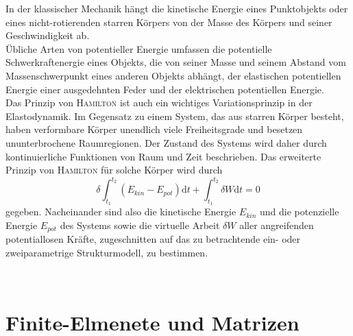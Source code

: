 \documentclass[a4paper,10pt,twoside]{article}
\numberwithin{equation}{section} %
\numberwithin{figure}{section}   %
\numberwithin{table}{section}    %
\begin{document}
	In der klassischer Mechanik hängt die kinetische Energie eines Punktobjekts oder eines nicht-rotierenden starren Körpers von der Masse des Körpers und seiner Geschwindigkeit ab. \\

	Übliche Arten von potentieller Energie umfassen die potentielle Schwerkraftenergie eines Objekts, die von seiner Masse und seinem Abstand vom Massenschwerpunkt eines anderen Objekts abhängt, der elastischen potentiellen Energie einer ausgedehnten Feder und der elektrischen potentiellen Energie.\\	
	
	Das Prinzip von \textsc{Hamilton} ist auch ein wichtiges Variationsprinzip in der Elastodynamik. Im Gegensatz zu einem System, das aus starren Körper besteht, haben verformbare Körper unendlich viele Freiheitsgrade und besetzen ununterbrochene Raumregionen. Der Zustand des Systems wird daher durch kontinuierliche Funktionen von Raum und Zeit beschrieben. Das erweiterte Prinzip von \textsc{Hamilton} für solche Körper wird durch
	\begin{equation}\label{equ:Hamilton}
	\delta\int_{t_{1}}^{t_{2}} \left( E_{kin}-E_{pot}\right)  \mathrm{d}t + \int_{t_{1}}^{t_{2}} \delta W \mathrm{d}t = 0
	\end{equation}
	gegeben.
	Nacheinander sind also die kinetische Energie $ E_{kin} $ und die potenzielle Energie $ E_{pot} $ des Systems sowie die virtuelle Arbeit $ \delta W $ aller angreifenden potentiallosen Kräfte, zugeschnitten auf das zu betrachtende ein- oder zweiparametrige Strukturmodell, zu bestimmen. \cite{wauer2014kontinuumsschwingungen}
	
	\clearpage
	
	\newpage
	\pagestyle{empty}
	\ \\
	\newpage
	\pagestyle{fancy}
	\section{Finite-Elmenete und Matrizen} \label{sec:eindimensional-fall}
	
\end{document}
